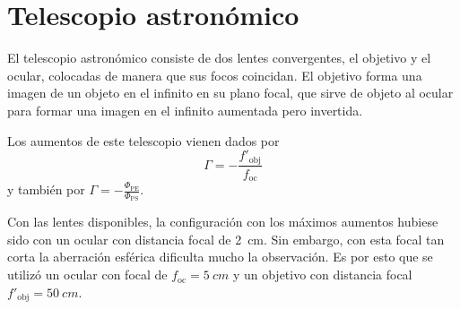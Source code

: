 \documentclass[12pt]{article}
\numberwithin{table}{section}
\numberwithin{figure}{section}
\numberwithin{equation}{section}
\begin{document}
\section{Telescopio astronómico}

El telescopio astronómico consiste de dos lentes convergentes, el objetivo y el ocular, colocadas de manera que sus focos coincidan. El objetivo forma una imagen de un objeto en el infinito en su plano focal, que sirve de objeto al ocular para formar una imagen en el infinito aumentada pero invertida.

Los aumentos de este telescopio vienen dados por
\begin{equation} \label{eqn:aumentos astronomico}
	\Gamma = -\frac{f'_\text{obj}}{f_\text{oc}}
\end{equation}
y también por \( \Gamma = - \frac{\Phi_\text{PE}}{\Phi_\text{PS}} \).

Con las lentes disponibles, la configuración con los máximos aumentos hubiese sido con un ocular con distancia focal de \SI{2}{cm}. Sin embargo, con esta focal tan corta la aberración esférica dificulta mucho la observación. Es por esto que se utilizó un ocular con focal de \( f_\text{oc} = \SI{5}{cm} \) y un objetivo con distancia focal \( f'_\text{obj} = \SI{50}{cm} \).
\end{document}
